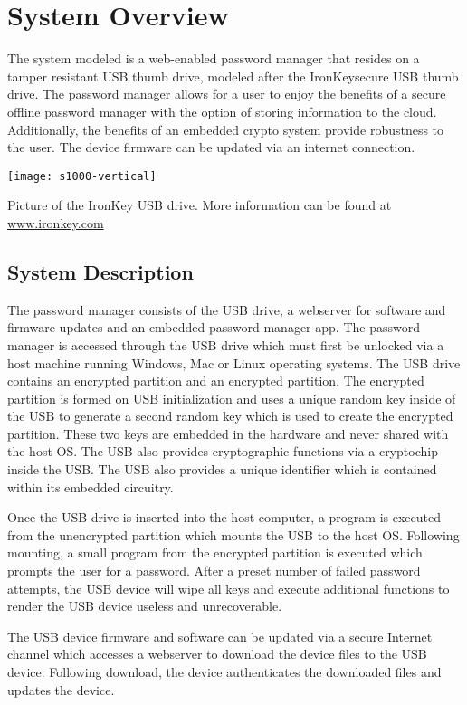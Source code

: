 \chapter{System Overview}
\label{ch:System Overview}
The system modeled is a web-enabled password manager that resides on a
tamper resistant USB thumb drive, modeled after the
IronKey\texttrademark secure USB thumb drive. The password manager
allows for a user to enjoy the benefits of a secure offline password
manager with the option of storing information to the cloud.
Additionally, the benefits of an embedded crypto system provide
robustness to the user.  The device firmware can be updated via an
internet connection.

\begin{marginfigure}%
\centering
  \texttt{[image: s1000-vertical]}
  \caption{Picture of the IronKey USB drive.  More information can be
found at \url{www.ironkey.com}}
  \label{fig:ik}
\end{marginfigure}



\section{System Description}
\label{sec:sysdesc}

The password manager consists of the USB drive, a webserver for software and firmware updates and an embedded password manager app.  The password manager is accessed through the USB drive which must first be unlocked via a host machine running Windows, Mac or Linux operating
systems. The USB drive contains an encrypted partition and an
encrypted partition.  The encrypted partition is formed on USB
initialization and uses a unique random key inside of the USB to
generate a second random key which is used to create the encrypted
partition. These two keys are embedded in the hardware and never
shared with the host OS.  The USB also provides cryptographic functions via a cryptochip inside the USB.  The USB also provides a unique identifier which is contained within its embedded circuitry.
\par Once the USB drive is inserted into the host computer, a program
is executed from the unencrypted partition which mounts the USB to the
host OS.  Following mounting, a small program from the encrypted
partition is executed which prompts the user for a password. After a
preset number of failed password attempts, the USB device will wipe
all keys and execute additional functions to render the USB device
useless and unrecoverable.
\par The USB device firmware and software can be updated via a secure Internet channel which accesses a webserver to download the device files to the USB device.  Following download, the device authenticates the downloaded files and updates the device.

